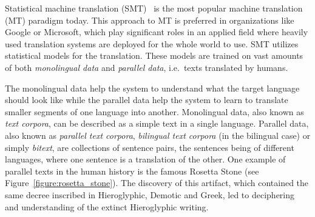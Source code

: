 
\label{chapter:introduction}

Statistical machine translation (SMT)~\cite{Koehn09} is the most popular machine translation (MT) paradigm today. This approach to MT is preferred in organizations like Google or Microsoft, which play significant roles in an applied field where heavily used translation systems are deployed for the whole world to use. SMT utilizes statistical models for the translation. These models are trained on vast amounts of both \textit{monolingual data} and \textit{parallel data}, i.e.\ texts translated by humans.

The monolingual data help the system to understand what the target language should look like while the parallel data help the system to learn to translate smaller segments of one language into another. Monolingual data, also known as \textit{text corpora}, can be described as a simple text in a single language. Parallel data, also known as \textit{parallel text corpora}, \textit{bilingual text corpora} (in the bilingual case) or simply \textit{bitext}, are collections of sentence pairs, the sentences being of different languages, where one sentence is a translation of the other. One example of parallel texts in the human history is the famous Rosetta Stone (see Figure~\ref{figure:rosetta_stone}). The discovery of this artifact, which contained the same decree inscribed in Hieroglyphic, Demotic and Greek, led to deciphering and understanding of the extinct Hieroglyphic writing.

